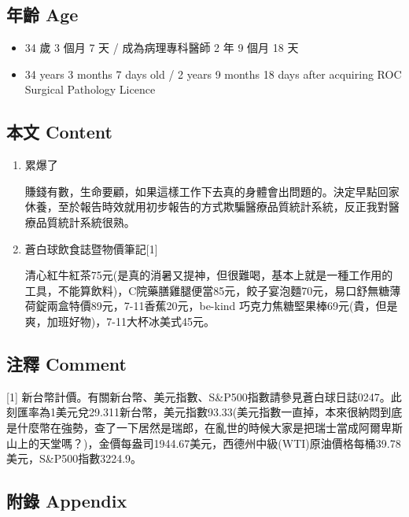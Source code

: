 \documentclass[a5paper, 11pt
]{book}
\providecommand{\tightlist}{%
  \setlength{\itemsep}{0pt}\setlength{\parskip}{0pt}}
\begin{document}
\hypertarget{ux5e74ux9f61-age-59}{%
\subsection{年齡 Age}\label{ux5e74ux9f61-age-59}}

\begin{itemize}
\tightlist
\item
  34 歲 3 個月 7 天 / 成為病理專科醫師 2 年 9 個月 18 天
\item
  34 years 3 months 7 days old / 2 years 9 months 18 days after
  acquiring ROC Surgical Pathology Licence
\end{itemize}

\hypertarget{ux672cux6587-content-59}{%
\subsection{本文 Content}\label{ux672cux6587-content-59}}

\begin{enumerate}
\def\labelenumi{\arabic{enumi}.}
\item
  累爆了

  賺錢有數，生命要顧，如果這樣工作下去真的身體會出問題的。決定早點回家休養，至於報告時效就用初步報告的方式欺騙醫療品質統計系統，反正我對醫療品質統計系統很熟。
\item
  蒼白球飲食誌暨物價筆記{[}1{]}

  清心紅牛紅茶75元(是真的消暑又提神，但很難喝，基本上就是一種工作用的工具，不能算飲料)，C院藥膳雞腿便當85元，餃子宴泡麵70元，易口舒無糖薄荷錠兩盒特價89元，7-11香蕉20元，be-kind
  巧克力焦糖堅果棒69元(貴，但是爽，加班好物)，7-11大杯冰美式45元。
\end{enumerate}

\hypertarget{ux6ce8ux91cb-comment-59}{%
\subsection{注釋 Comment}\label{ux6ce8ux91cb-comment-59}}

{[}1{]}
新台幣計價。有關新台幣、美元指數、S\&P500指數請參見蒼白球日誌0247。此刻匯率為1美元兌29.311新台幣，美元指數93.33(美元指數一直掉，本來很納悶到底是什麼幣在強勢，查了一下居然是瑞郎，在亂世的時候大家是把瑞士當成阿爾卑斯山上的天堂嗎？)，金價每盎司1944.67美元，西德州中級(WTI)原油價格每桶39.78美元，S\&P500指數3224.9。

\hypertarget{ux9644ux9304-appendix-59}{%
\subsection{附錄 Appendix}\label{ux9644ux9304-appendix-59}}
\end{document}
